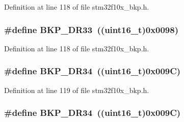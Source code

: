Definition at line 118 of file stm32f10x\+\_\+bkp.\+h.

\subsubsection[{\texorpdfstring{B\+K\+P\+\_\+\+D\+R33}{BKP_DR33}}]{\setlength{\rightskip}{0pt plus 5cm}\#define B\+K\+P\+\_\+\+D\+R33~(({\bf uint16\+\_\+t})0x0098)}\hypertarget{group___data___backup___register_ga9a52ed4d0d70fc9d815d5e15945ad0d8}{}\label{group___data___backup___register_ga9a52ed4d0d70fc9d815d5e15945ad0d8}


Definition at line 118 of file stm32f10x\+\_\+bkp.\+h.

\subsubsection[{\texorpdfstring{B\+K\+P\+\_\+\+D\+R34}{BKP_DR34}}]{\setlength{\rightskip}{0pt plus 5cm}\#define B\+K\+P\+\_\+\+D\+R34~(({\bf uint16\+\_\+t})0x009\+C)}\hypertarget{group___data___backup___register_ga8553dfcf67aad9107544cf52bf0a54a5}{}\label{group___data___backup___register_ga8553dfcf67aad9107544cf52bf0a54a5}


Definition at line 119 of file stm32f10x\+\_\+bkp.\+h.

\subsubsection[{\texorpdfstring{B\+K\+P\+\_\+\+D\+R34}{BKP_DR34}}]{\setlength{\rightskip}{0pt plus 5cm}\#define B\+K\+P\+\_\+\+D\+R34~(({\bf uint16\+\_\+t})0x009\+C)}\hypertarget{group___data___backup___register_ga8553dfcf67aad9107544cf52bf0a54a5}{}\label{group___data___backup___register_ga8553dfcf67aad9107544cf52bf0a54a5}


